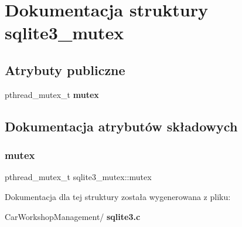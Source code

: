 \section{Dokumentacja struktury sqlite3\+\_\+mutex}
\label{structsqlite3__mutex}
\subsection*{Atrybuty publiczne}
\begin{DoxyCompactItemize}
\item 
pthread\+\_\+mutex\+\_\+t \textbf{ mutex}
\end{DoxyCompactItemize}


\subsection{Dokumentacja atrybutów składowych}
\mbox{\label{structsqlite3__mutex_a6eef25bee73a3640dbbd052d707dbfdc}} 
\subsubsection{mutex}
{\footnotesize\ttfamily pthread\+\_\+mutex\+\_\+t sqlite3\+\_\+mutex\+::mutex}



Dokumentacja dla tej struktury została wygenerowana z pliku\+:\begin{DoxyCompactItemize}
\item 
Car\+Workshop\+Management/\textbf{ sqlite3.\+c}\end{DoxyCompactItemize}
